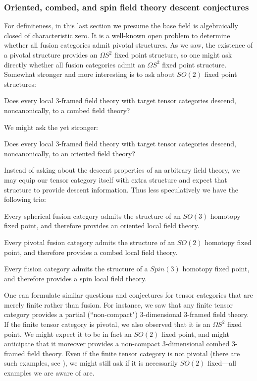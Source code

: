 \documentclass{amsart}
\begin{document}
\subsubsection{Oriented, combed, and spin field theory descent conjectures}

For definiteness, in this last section we presume the base field is algebraically closed of characteristic zero.  It is a well-known open problem to determine whether all fusion categories admit pivotal structures.  As we saw, the existence of a pivotal structure provides an $\Omega S^2$ fixed point structure, so one might ask directly whether all fusion categories admit an $\Omega S^2$ fixed point structure.  Somewhat stronger and more interesting is to ask about $SO(2)$ fixed point structures:
\begin{question}
Does every local 3-framed field theory with target tensor categories descend, noncanonically, to a combed field theory?
\end{question}
\nid We might ask the yet stronger:
\begin{question}
Does every local 3-framed field theory with target tensor categories descend, noncanonically, to an oriented field theory?
\end{question} %

Instead of asking about the descent properties of an arbitrary field theory, we may equip our tensor category itself with extra structure and expect that structure to provide descent information.  Thus less speculatively we have the following trio:
\begin{conjecture}
Every spherical fusion category admits the structure of an $SO(3)$ homotopy fixed point, and therefore provides an oriented local field theory.
\end{conjecture}
\begin{conjecture}
Every pivotal fusion category admits the structure of an $SO(2)$ homotopy fixed point, and therefore provides a combed local field theory.
\end{conjecture}
\begin{conjecture}
Every fusion category admits the structure of a $Spin(3)$ homotopy fixed point, and therefore provides a spin local field theory.
\end{conjecture}

One can formulate similar questions and conjectures for tensor categories that are merely finite rather than fusion.  For instance, we saw that any finite tensor category provides a partial (``non-compact") 3-dimensional 3-framed field theory.  If the finite tensor category is pivotal, we also observed that it is an $\Omega S^2$ fixed point.  We might expect it to be in fact an $SO(2)$ fixed point, and might anticipate that it moreover provides a non-compact 3-dimensional combed 3-framed field theory.  Even if the finite tensor category is not pivotal (there are such examples, see \cite[Rem. 2.11]{1204.5807}), we might still ask if it is necessarily $SO(2)$ fixed---all examples we are aware of are.
\end{document}
